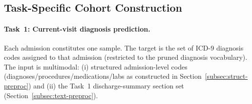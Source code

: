 
\subsection{Task-Specific Cohort Construction}
\label{subsec:cohort-construction}

\paragraph{Task~1: Current-visit diagnosis prediction.}
Each admission constitutes one sample. The target is the set of ICD-9 diagnosis codes assigned to that admission (restricted to the pruned diagnosis vocabulary). The input is multimodal: (i) structured admission-level codes (diagnoses/procedures/medications/labs as constructed in Section~\ref{subsec:struct-preproc}) and (ii) the Task~1 discharge-summary section set (Section~\ref{subsec:text-preproc}).

